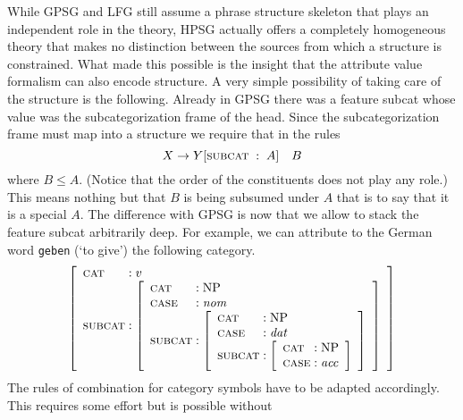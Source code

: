 While GPSG and LFG still assume a phrase structure skeleton that
plays an independent role in the theory, HPSG actually offers a
completely homogeneous theory that makes no distinction between
the sources from which a structure is constrained. What made this
possible is the insight that the attribute value formalism can
also encode structure. A very simple possibility of taking care of
the structure is the following. Already in GPSG there was a
feature {\sc subcat} whose value was the subcategorization frame
of the head. Since the subcategorization frame must map into a
structure we require that in the rules
\begin{equation}
X \rightarrow Y[\mbox{\sc subcat}\; : \; A]\quad B
\end{equation}
where $B \leq A$. (Notice that the order of the constituents does 
not play any role.) This means nothing but that $B$ is being
subsumed under $A$ that is to say that it is a special $A$. The
difference with GPSG is now that we allow to stack the feature
{\sc subcat} arbitrarily deep. For example, we can attribute to
the German word {\tt geben} (`to give') the following category.
\begin{equation}
\left[\begin{array}{l@{\; :\;}l}
\mbox{\sc cat} & v \\
\mbox{\sc subcat} &
    \left[
    \begin{array}{l@{\; :\;}l}
        \mbox{\sc cat} & \mbox{\rm NP} \\
    \mbox{\sc case} & \mbox{\it nom\/} \\
    \mbox{\sc subcat} &
        \left[
        \begin{array}{l@{\; :\;}l}
            \mbox{\sc cat} & \mbox{\rm NP} \\
        \mbox{\sc case} & \mbox{\it dat\/} \\
        \mbox{\sc subcat} &
            \left[
            \begin{array}{l@{\; :\;}l}
                \mbox{\sc cat} & \mbox{\rm NP} \\
            \mbox{\sc case} & \mbox{\it acc\/}
            \end{array}\right]
        \end{array}\right]
    \end{array}\right]
\end{array}\right]
\end{equation}
The rules of combination for category symbols have to be adapted
accordingly. This requires some effort but is possible without
